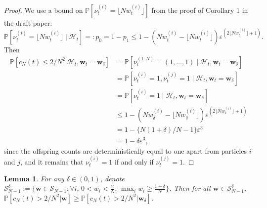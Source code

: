\documentclass{article}
\newtheorem{lemma}{Lemma}
\newcommand{\Prob}{\mathbb{P}}
\newcommand{\1}[1]{\mathbb{I}_{#1}}
\begin{document}
\begin{proof}
We use a bound on $\Prob[ \nu_t^{(i)} = \lfloor N w_t^{(i)} \rfloor ]$ from the proof of Corollary 1 in the draft paper:
\begin{equation*}
\Prob[ \nu_t^{(i)} = \lfloor N w_t^{(i)} \rfloor \mid \mathcal{H}_t] =: p_0 = 1-p_1 \leq 1 - (Nw_t^{(i)} - \lfloor N w_t^{(i)} \rfloor ) \varepsilon^{(2\lfloor N w_t^{(i)} \rfloor +1)} .
\end{equation*}
Then
\begin{align*}
\Prob[c_N(t) \leq 2/N^2 | \mathcal{H}_t, \mathbf{w}_t = \mathbf{w}_\delta]
&= \Prob[\nu_t^{(1:N)} = (1,\dots, 1) \mid \mathcal{H}_t, \mathbf{w}_t = \mathbf{w}_\delta] \\
&= \Prob[\nu_t^{(i)} = 1, \nu_t^{(j)} = 1 \mid \mathcal{H}_t, \mathbf{w}_t = \mathbf{w}_\delta] \\
&= \Prob[\nu_t^{(i)} = 1 \mid \mathcal{H}_t, \mathbf{w}_t = \mathbf{w}_\delta] \\
&\leq 1- (N w_\delta^{(i)} - \lfloor N w_\delta^{(i)} \rfloor) \varepsilon^{(2\lfloor N w_\delta^{(i)} \rfloor +1)} \\
&= 1- \{N(1+ \delta)/N - 1\}\varepsilon^3 \\
&= 1 - \delta\varepsilon^3 ,
\end{align*}
since the offspring counts are deterministically equal to one apart from particles $i$ and $j$, and it remains that $\nu_t^{(i)} = 1$ if and only if $\nu_t^{(j)} = 1$.
\end{proof}




\begin{lemma}
For any $\delta \in (0, 1)$, denote $\mathcal{S}_{N-1}^\delta := \{ \mathbf{w} \in \mathcal{S}_{N-1} :  \forall i, \, 0 <w_i <\frac{2}{N} ;\, \max_i w_i \geq \frac{1 + \delta}{N} \}$.
Then for all $\mathbf{w} \in \mathcal{S}_{N-1}^\delta$, 
$\Prob[c_N(t) > 2/N^2 | \mathbf{w} ] \geq \Prob[c_N(t) > 2/N^2 | \mathbf{w}_\delta ]$.
\end{lemma}
\end{document}
